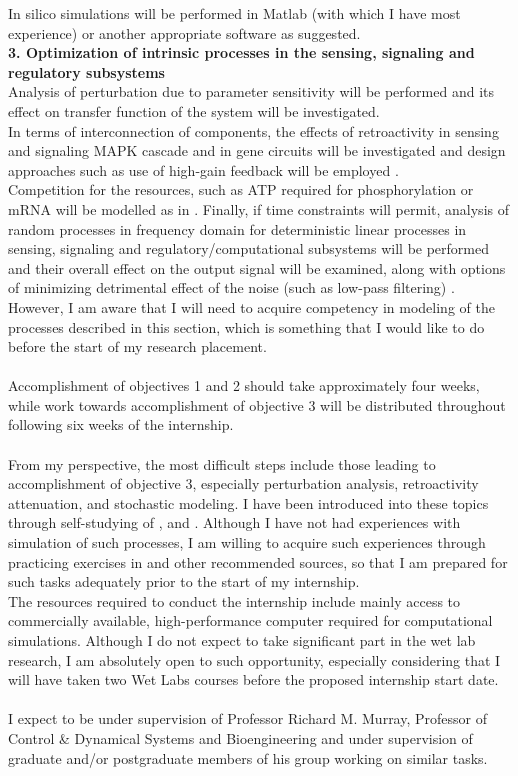 \documentclass{article}
\begin{document}
In silico simulations will be performed in Matlab (with which I have most experience) or another appropriate software as suggested.\\
\textbf{3. Optimization of intrinsic processes in the sensing, signaling and regulatory subsystems}\\ Analysis of perturbation due to parameter sensitivity will be performed and its effect on transfer function of the system will be investigated. \\
In terms of interconnection of components, the effects of retroactivity in sensing and signaling MAPK cascade and in gene circuits will be investigated and design approaches such as use of high-gain feedback will be employed \cite{biofeedback}. \\
Competition for the resources, such as ATP required for phosphorylation or mRNA will be modelled as in \cite{biofeedback}. Finally, if time constraints will permit, analysis of random processes in frequency domain for deterministic linear processes in sensing, signaling and regulatory/computational subsystems will be performed and their overall effect on the output signal will be examined, along with options of minimizing detrimental effect of the noise (such as low-pass filtering) \cite{biofeedback}. However, I am aware that I will need to acquire competency in modeling of the processes described in this section, which is something that I would like to do before the start of my research placement.
\\
\\
Accomplishment of objectives 1 and 2 should take approximately four weeks, while work towards accomplishment of objective 3 will be distributed throughout following six weeks of the internship. 
\\
\\
From my perspective, the most difficult steps include those leading to accomplishment of objective 3, especially perturbation analysis, retroactivity attenuation, and stochastic modeling. I have been introduced into these topics through self-studying of \cite{biofeedback}, \cite{strogatz} and \cite{slotine}. Although I have not had experiences with simulation of such processes, I am willing to acquire such experiences through practicing exercises in \cite{biofeedback} and other recommended sources, so that I am prepared for such tasks adequately prior to the start of my internship. \\
The resources required to conduct the internship include mainly access to commercially available, high-performance computer required for computational simulations. Although I do not expect to take significant part in the wet lab research, I am absolutely open to such opportunity, especially considering that I will have taken two Wet Labs courses before the proposed internship start date.\\
\\
I expect to be under supervision of Professor Richard M. Murray, Professor of Control \& Dynamical Systems and Bioengineering and under supervision of graduate and/or postgraduate members of his group working on similar tasks.
\end{document}
